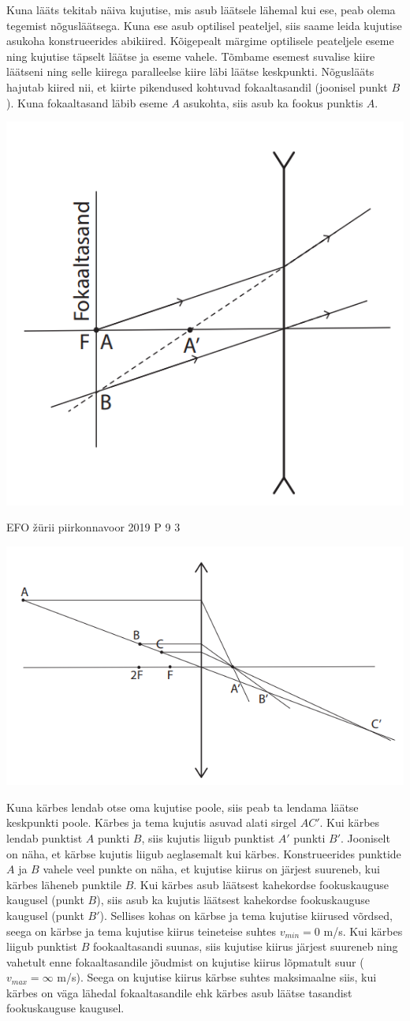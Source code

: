 \documentclass[11pt]{article}
\begin{document}
{{\ifSolution
Kuna lääts tekitab näiva kujutise, mis asub läätsele lähemal kui ese, peab olema tegemist nõgusläätsega. Kuna ese asub optilisel peateljel, siis saame leida kujutise asukoha konstrueerides abikiired. Kõigepealt märgime optilisele peateljele eseme ning kujutise täpselt läätse ja eseme vahele. Tõmbame esemest suvalise kiire läätseni ning selle kiirega paralleelse kiire läbi läätse keskpunkti. Nõguslääts hajutab kiired nii, et kiirte pikendused kohtuvad fokaaltasandil (joonisel punkt $B$). Kuna fokaaltasand läbib eseme $A$ asukohta, siis asub ka fookus punktis $A$.
\begin{center}
	\includegraphics[width=0.5\linewidth]{2019-v2p-08-lah.PNG}
\end{center}
\fi
}


{EFO žürii} %
{piirkonnavoor} %
{2019} %
{P 9} %
{3} %
{

\ifSolution
\begin{center}
	\includegraphics[width=0.5\linewidth]{2019-v2p-09-lah.PNG}
\end{center}
Kuna kärbes lendab otse oma kujutise poole, siis peab ta lendama läätse keskpunkti poole. Kärbes ja tema kujutis asuvad alati sirgel $AC'$. Kui kärbes lendab punktist $A$ punkti $B$, siis kujutis liigub punktist $A'$ punkti $B'$. Jooniselt on näha, et kärbse kujutis liigub aeglasemalt kui kärbes. Konstrueerides punktide $A$ ja $B$ vahele veel punkte on näha, et kujutise kiirus on järjest suureneb, kui kärbes läheneb punktile $B$. Kui kärbes asub läätsest kahekordse fookuskauguse kaugusel (punkt $B$), siis asub ka kujutis läätsest kahekordse fookuskauguse kaugusel (punkt $B'$). Sellises kohas on kärbse ja tema kujutise kiirused võrdsed, seega on kärbse ja tema kujutise kiirus teineteise suhtes $v_{min} = 0$ m/s. Kui kärbes liigub punktist $B$ fookaaltasandi suunas, siis kujutise kiirus järjest suureneb ning vahetult enne fokaaltasandile jõudmist on kujutise kiirus lõpmatult suur ($v_{max} = \infty$ m/s). Seega on kujutise kiirus kärbse suhtes maksimaalne siis, kui kärbes on väga lähedal fokaaltasandile ehk kärbes asub läätse tasandist fookuskauguse kaugusel.
\fi
}


}
\end{document}
